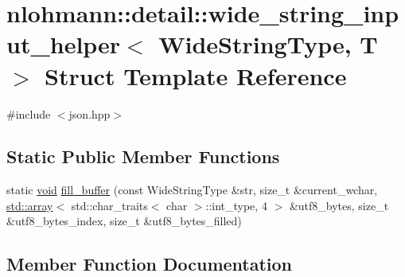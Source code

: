 \hypertarget{structnlohmann_1_1detail_1_1wide__string__input__helper}{}\section{nlohmann\+::detail\+::wide\+\_\+string\+\_\+input\+\_\+helper$<$ Wide\+String\+Type, T $>$ Struct Template Reference}
\label{structnlohmann_1_1detail_1_1wide__string__input__helper}


{\ttfamily \#include $<$json.\+hpp$>$}

\subsection*{Static Public Member Functions}
\begin{DoxyCompactItemize}
\item 
static \mbox{\hyperlink{namespacenlohmann_1_1detail_a59fca69799f6b9e366710cb9043aa77d}{void}} \mbox{\hyperlink{structnlohmann_1_1detail_1_1wide__string__input__helper_ae82d79118fa319a97e4a40568186a922}{fill\+\_\+buffer}} (const Wide\+String\+Type \&str, size\+\_\+t \&current\+\_\+wchar, \mbox{\hyperlink{namespacenlohmann_1_1detail_a1ed8fc6239da25abcaf681d30ace4985af1f713c9e000f5d3f280adbd124df4f5}{std\+::array}}$<$ std\+::char\+\_\+traits$<$ char $>$\+::int\+\_\+type, 4 $>$ \&utf8\+\_\+bytes, size\+\_\+t \&utf8\+\_\+bytes\+\_\+index, size\+\_\+t \&utf8\+\_\+bytes\+\_\+filled)
\end{DoxyCompactItemize}


\subsection{Member Function Documentation}
\mbox{\label{structnlohmann_1_1detail_1_1wide__string__input__helper_ae82d79118fa319a97e4a40568186a922}} 
